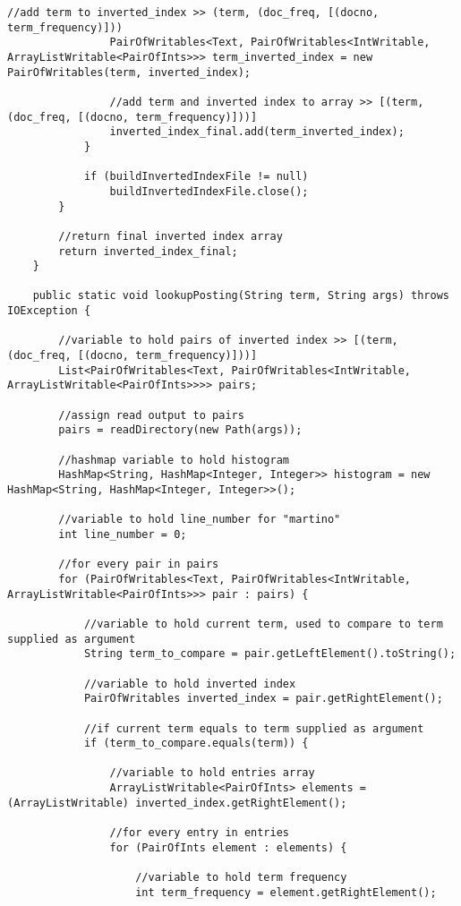 \documentclass{article} %
\begin{document}
\begin{lstlisting}[style=Java]
                //add term to inverted_index >> (term, (doc_freq, [(docno, term_frequency)]))
                PairOfWritables<Text, PairOfWritables<IntWritable, ArrayListWritable<PairOfInts>>> term_inverted_index = new PairOfWritables(term, inverted_index);
                
                //add term and inverted index to array >> [(term, (doc_freq, [(docno, term_frequency)]))]
                inverted_index_final.add(term_inverted_index);
			}
			
			if (buildInvertedIndexFile != null)
				buildInvertedIndexFile.close();
		}
        
        //return final inverted index array
		return inverted_index_final;
	}
	
	public static void lookupPosting(String term, String args) throws IOException {
		
		//variable to hold pairs of inverted index >> [(term, (doc_freq, [(docno, term_frequency)]))]
		List<PairOfWritables<Text, PairOfWritables<IntWritable, ArrayListWritable<PairOfInts>>>> pairs;
		
		//assign read output to pairs
		pairs = readDirectory(new Path(args));
		
		//hashmap variable to hold histogram
		HashMap<String, HashMap<Integer, Integer>> histogram = new HashMap<String, HashMap<Integer, Integer>>();
		
		//variable to hold line_number for "martino"
		int line_number = 0;
        
		//for every pair in pairs
		for (PairOfWritables<Text, PairOfWritables<IntWritable, ArrayListWritable<PairOfInts>>> pair : pairs) {
			
			//variable to hold current term, used to compare to term supplied as argument
			String term_to_compare = pair.getLeftElement().toString();
			
			//variable to hold inverted index
			PairOfWritables inverted_index = pair.getRightElement();
			
			//if current term equals to term supplied as argument
			if (term_to_compare.equals(term)) {
				
				//variable to hold entries array
				ArrayListWritable<PairOfInts> elements = (ArrayListWritable) inverted_index.getRightElement();
				
				//for every entry in entries
				for (PairOfInts element : elements) {
					
					//variable to hold term frequency
					int term_frequency = element.getRightElement();
					

\end{lstlisting}
\end{document}
